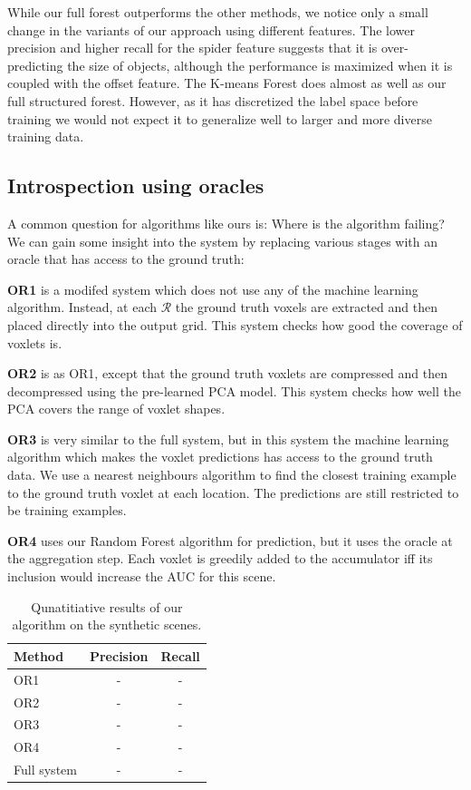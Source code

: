 \documentclass[10pt,twocolumn,letterpaper]{article}
\begin{document}
While our full forest outperforms the other methods, we notice only a small change in the variants of our approach using different features.
The lower precision and higher recall for the spider feature suggests that it is over-predicting the size of objects, although the performance is maximized when it is coupled with the offset feature.
The K-means Forest does almost as well as our full structured forest.
However, as it has discretized the label space before training we would not expect it to generalize well to larger and more diverse training data.

\subsection{Introspection using oracles}

A common question for algorithms like ours is: Where is the algorithm failing? We can gain some insight into the system by replacing various stages with an oracle that has access to the ground truth:

\textbf{OR1} is a modifed system which does not use any of the machine learning algorithm. Instead, at each $\mathcal{R}$ the ground truth voxels are extracted and then placed directly into the output grid. This system checks how good the coverage of voxlets is.

\textbf{OR2} is as OR1, except that the ground truth voxlets are compressed and then decompressed using the pre-learned PCA model. This system checks how well the PCA covers the range of voxlet shapes.

\textbf{OR3} is very similar to the full system, but in this system the machine learning algorithm which makes the voxlet predictions has access to the ground truth data. We use a nearest neighbours algorithm to find the closest training example to the ground truth voxlet at each location. The predictions are still restricted to be training examples.

\textbf{OR4} uses our Random Forest algorithm for prediction, but it uses the oracle at the aggregation step. Each voxlet is greedily added to the accumulator iff its inclusion would increase the AUC for this scene.


\begin{table}
  \centering
  \begin{tabular}{|p{4.8cm}|c|c|}
  \hline
  \textbf{Method}  &   \textbf{Precision} & \textbf{Recall} \\
  \hline
  OR1 & - & - \\
  OR2 & - & - \\
  OR3 & - & - \\
  OR4 & - & - \\
  Full system & - & - \\
  \hline
  \end{tabular}
  \vspace{5pt}
  \caption{Qunatitiative results of our algorithm on the synthetic scenes.}
    \label{tab:oracle_results}
\end{table}
\end{document}

